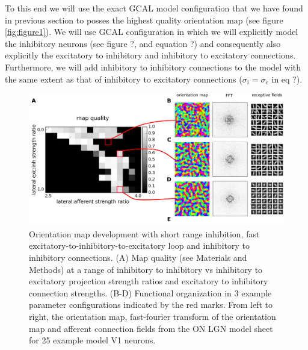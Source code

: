 \documentclass[a4paper,10pt]{article}
\begin{document}
To this end we will use the exact GCAL model configuration that we have found in previous section to posses the highest
quality orientation map (see figure \ref{fig:figure1}). We will use GCAL configuration in which we will explicitly model the inhibitory neurons
(see figure ?, and equation ?) and consequently also explicitly the excitatory to inhibitory and inhibitory to excitatory connections.
Furthermore, we will add inhibitory to inhibitory connections to the model with the same extent as that of inhibitory to excitatory
connections ($\sigma_{i} = \sigma_{e}$ in eq ?). 

\begin{figure}[htpb!] 
\centering
\includegraphics[width=16cm]{./SVG/Figure2/figure2.png}
\caption{Orientation map development with short range inhibition, fast excitatory-to-inhibitory-to-excitatory loop and inhibitory to inhibitory connections. (A) Map quality (see Materials and Methods) at a range of 
inhibitory to inhibitory vs inhibitory to excitatory projection strength ratios and excitatory to inhibitory connection strengths. (B-D) Functional organization in 3 example parameter configurations 
indicated by the red marks. From left to right, the orientation map, fast-fourier transform of the orientation map and afferent connection fields from the ON LGN model sheet for 25 example model V1 neurons. }
\label{fig:figure2}
\end{figure} 
\end{document}
